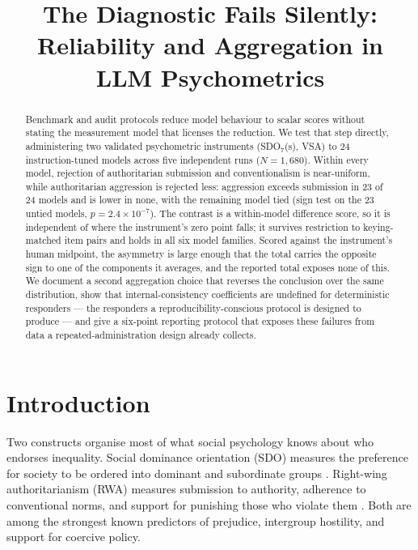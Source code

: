 \documentclass{article}
\title{The Diagnostic Fails Silently: Reliability and Aggregation in LLM Psychometrics}
\begin{document}
\maketitle

\begin{abstract}
Benchmark and audit protocols reduce model behaviour to scalar scores without stating the measurement model that licenses the reduction. We test that step directly, administering two validated psychometric instruments (SDO$_7$(s), VSA) to 24 instruction-tuned models across five independent runs ($N = 1{,}680$). Within every model, rejection of authoritarian submission and conventionalism is near-uniform, while authoritarian aggression is rejected less: aggression exceeds submission in 23 of 24 models and is lower in none, with the remaining model tied (sign test on the 23 untied models, $p = 2.4 \times 10^{-7}$). The contrast is a within-model difference score, so it is independent of where the instrument's zero point falls; it survives restriction to keying-matched item pairs and holds in all six model families. Scored against the instrument's human midpoint, the asymmetry is large enough that the total carries the opposite sign to one of the components it averages, and the reported total exposes none of this. We document a second aggregation choice that reverses the conclusion over the same distribution, show that internal-consistency coefficients are undefined for deterministic responders --- the responders a reproducibility-conscious protocol is designed to produce --- and give a six-point reporting protocol that exposes these failures from data a repeated-administration design already collects.
\end{abstract}

\section{Introduction}

Two constructs organise most of what social psychology knows about who endorses inequality. Social dominance orientation (SDO) measures the preference for society to be ordered into dominant and subordinate groups \citep{pratto1994,sidanius1999}. Right-wing authoritarianism (RWA) measures submission to authority, adherence to conventional norms, and support for punishing those who violate them \citep{altemeyer1981,altemeyer1996}. Both are among the strongest known predictors of prejudice, intergroup hostility, and support for coercive policy.
\end{document}
